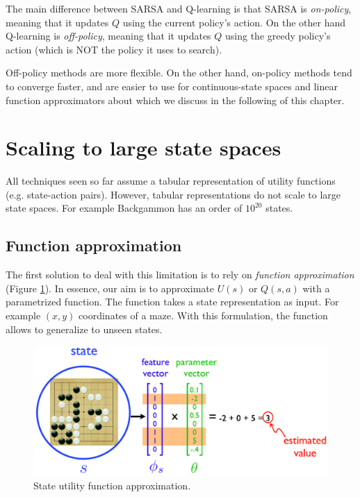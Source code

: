 The main difference between SARSA and Q-learning is that SARSA is \textit{on-policy},
meaning that it updates $Q$ using the current policy's action. On the other hand
Q-learning is \textit{off-policy}, meaning that it updates $Q$ using the greedy policy's
action (which is NOT the policy it uses to search).
\newline

Off-policy methods are more flexible. On the other hand, on-policy methods tend to
converge faster, and are easier to use for continuous-state spaces and linear
function approximators about which we discuss in the following of this chapter.

\section{Scaling to large state spaces}
All techniques seen so far assume a tabular representation of utility functions
(e.g. state-action pairs). However, tabular representations do not scale to large
state spaces. For example Backgammon has an order of $10^{20}$ states.

\subsection{Function approximation}
The first solution to deal with this limitation is to rely on \textit{function
approximation} (Figure \ref{fig:functionApproximation}). In essence, our aim is to
approximate $U(s)$ or $Q(s,a)$ with a parametrized function. The function takes
a state representation as input. For example $(x,y)$ coordinates of a maze. With
this formulation, the function allows to generalize to unseen states.

\begin{figure}[H]
	\centering
	\includegraphics[width=\textwidth]{
		images/19_ReinforcementLearning_functionApproximation.png
	}
	\caption{State utility function approximation.}
	\label{fig:functionApproximation}
\end{figure}

